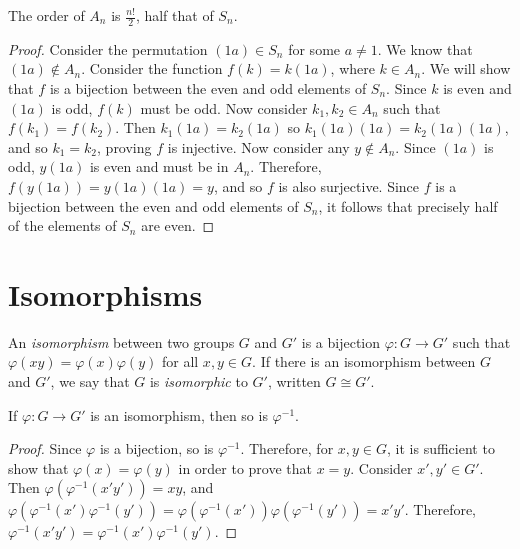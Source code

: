 \documentclass[12pt]{article}
\begin{document}
\begin{prop}
    The order of $A_n$ is $\frac{n!}{2}$, half that of $S_n$.
\end{prop}

\begin{proof}
    Consider the permutation $(1a) \in S_n$ for some $a \neq 1$. We know that $(1a) \not\in A_n$. Consider the function $f(k) = k(1a)$, where $k \in A_n$. We will show that $f$ is a bijection between the even and odd elements of $S_n$. Since $k$ is even and $(1a)$ is odd, $f(k)$ must be odd. Now consider $k_1, k_2 \in A_n$ such that $f(k_1) = f(k_2)$. Then $k_1(1a) = k_2(1a)$ so $k_1(1a)(1a) = k_2(1a)(1a)$, and so $k_1 = k_2$, proving $f$ is injective. Now consider any $y \not\in A_n$. Since $(1a)$ is odd, $y(1a)$ is even and must be in $A_n$. Therefore, $f(y(1a)) = y(1a)(1a) = y$, and so $f$ is also surjective. Since $f$ is a bijection between the even and odd elements of $S_n$, it follows that precisely half of the elements of $S_n$ are even.
\end{proof}

\section{Isomorphisms}

\begin{defn}
    An \emph{isomorphism} between two groups $G$ and $G'$ is a bijection $\varphi: G \to G'$ such that $\varphi(xy) = \varphi(x)\varphi(y)$ for all $x, y \in G$. If there is an isomorphism between $G$ and $G'$, we say that $G$ is \emph{isomorphic} to $G'$, written $G \cong G'$.
\end{defn}

\begin{prop}\label{isomorphism-inverse}
    If $\varphi: G \to G'$ is an isomorphism, then so is $\varphi^{-1}$.
\end{prop}

\begin{proof}
    Since $\varphi$ is a bijection, so is $\varphi^{-1}$. Therefore, for $x, y \in G$, it is sufficient to show that $\varphi(x) = \varphi(y)$ in order to prove that $x = y$. Consider $x', y' \in G'$. Then $\varphi\left(\varphi^{-1}(x'y')\right) = xy$, and $\varphi\left(\varphi^{-1}(x')\varphi^{-1}(y')\right) = \varphi\left(\varphi^{-1}(x')\right)\varphi\left(\varphi^{-1}(y')\right) = x'y'$. Therefore, $\varphi^{-1}(x'y') = \varphi^{-1}(x')\varphi^{-1}(y')$.
\end{proof}
\end{document}
